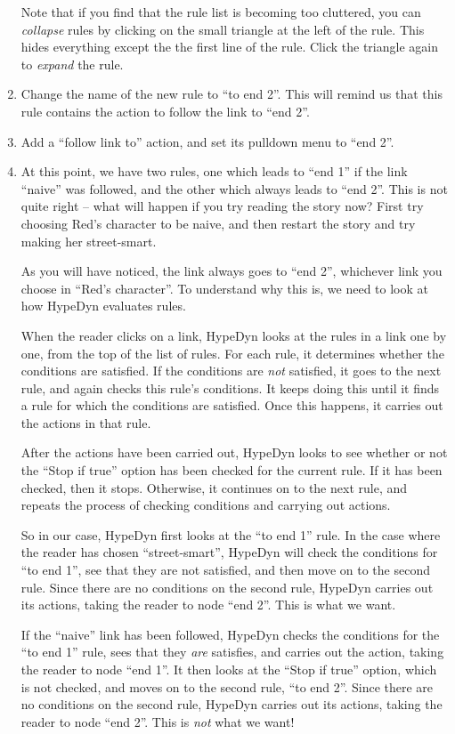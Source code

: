 \documentclass{article}
\begin{document}
\begin{enumerate}
Note that if you find that the rule list is becoming too cluttered, you can \textit{collapse} rules by clicking on the small triangle at the left of the rule. This hides everything except the the first line of the rule. Click the triangle again to \textit{expand} the rule.

\item Change the name of the new rule to ``to end 2''. This will remind us that this rule contains the action to follow the link to ``end 2''.

\item Add a ``follow link to'' action, and set its pulldown menu to ``end 2''.

\item At this point, we have two rules, one which leads to ``end 1'' if the link ``naive'' was followed, and the other which always leads to ``end 2''. This is not quite right -- what will happen if you try reading the story now? First try choosing Red's character to be naive, and then restart the story and try making her street-smart.

As you will have noticed, the link always goes to ``end 2'', whichever link you choose in ``Red's character''. To understand why this is, we need to look at how HypeDyn evaluates rules.

When the reader clicks on a link, HypeDyn looks at the rules in a link one by one, from the top of the list of rules. For each rule, it determines whether the conditions are satisfied. If the conditions are \textit{not} satisfied, it goes to the next rule, and again checks this rule's conditions. It keeps doing this until it finds a rule for which the conditions are satisfied. Once this happens, it carries out the actions in that rule.

After the actions have been carried out, HypeDyn looks to see whether or not the ``Stop if true'' option has been checked for the current rule. If it has been checked, then it stops. Otherwise, it continues on to the next rule, and repeats the process of checking conditions and carrying out actions.

So in our case, HypeDyn first looks at the ``to end 1'' rule. In the case where the reader has chosen ``street-smart'', HypeDyn will check the conditions for ``to end 1'', see that they are not satisfied, and then move on to the second rule. Since there are no conditions on the second rule, HypeDyn carries out its actions, taking the reader to node ``end 2''. This is what we want.

If the ``naive'' link has been followed, HypeDyn checks the conditions for the ``to end 1'' rule, sees that they \textit{are} satisfies, and carries out the action, taking the reader to node ``end 1''. It then looks at the ``Stop if true'' option, which is not checked, and moves on to the second rule, ``to end 2''. Since there are no conditions on the second rule, HypeDyn carries out its actions, taking the reader to node ``end 2''. This is \textit{not} what we want!


\end{enumerate}
\end{document}
